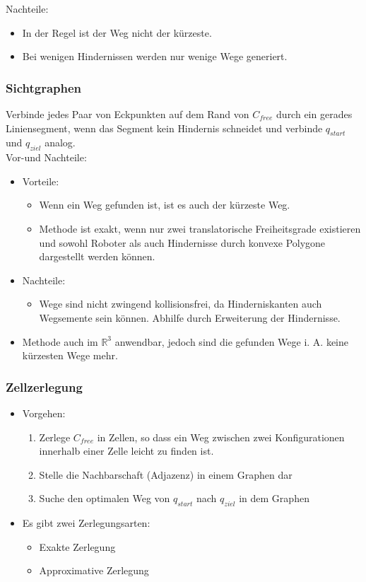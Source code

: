 \documentclass[paper=a4, fontsize=11pt]{scrartcl} %
\numberwithin{equation}{section} %
\numberwithin{figure}{section} %
\numberwithin{table}{section} %
\begin{document}
Nachteile:
\begin{itemize}
\item In der Regel ist der Weg nicht der kürzeste.
\item Bei wenigen Hindernissen werden nur wenige Wege generiert.
\end{itemize}

\subsubsection{Sichtgraphen}

Verbinde jedes Paar von Eckpunkten auf dem Rand von $C_{free}$ durch ein gerades Liniensegment, wenn das Segment kein Hindernis schneidet und verbinde $q_{start}$ und $q_{ziel}$ analog.\\ 

Vor-und Nachteile:
\begin{itemize}
\item Vorteile:
\begin{itemize}
\item Wenn ein Weg gefunden ist, ist es auch der kürzeste Weg.
\item Methode ist exakt, wenn nur zwei translatorische Freiheitsgrade existieren und sowohl Roboter als auch Hindernisse durch konvexe Polygone dargestellt werden können.
\end{itemize}
\item Nachteile:
\begin{itemize}
\item Wege sind nicht zwingend kollisionsfrei, da Hinderniskanten auch Wegsemente sein können. Abhilfe durch Erweiterung der Hindernisse.
\end{itemize}
\item Methode auch im $\mathbb{R}^3$ anwendbar, jedoch sind die gefunden Wege i. A. keine kürzesten Wege mehr.
\end{itemize}

\subsubsection{Zellzerlegung}

\begin{itemize}
\item Vorgehen:
\begin{enumerate}
\item Zerlege $C_{free}$ in Zellen, so dass ein Weg zwischen zwei Konfigurationen innerhalb einer Zelle leicht zu finden ist.
\item Stelle die Nachbarschaft (Adjazenz) in einem Graphen dar
\item Suche den optimalen Weg von $q_{start}$ nach $q_{ziel}$ in dem Graphen
\end{enumerate}
\item Es gibt zwei Zerlegungsarten:
\begin{itemize}
\item Exakte Zerlegung
\item Approximative Zerlegung
\end{itemize}
\end{itemize}
\end{document}
